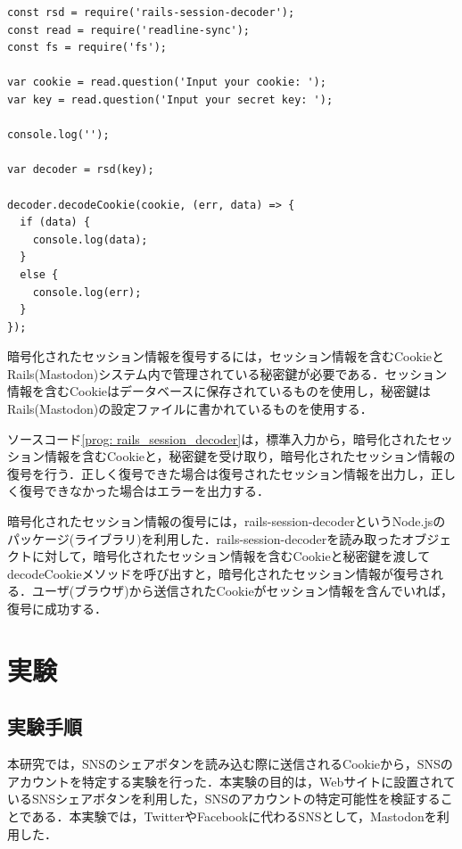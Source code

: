 \documentclass[10pt, a4paper]{jreport}
\begin{document}
\begin{lstlisting}[caption=Railsセッションデコーダ,label=prog: rails_session_decoder]
const rsd = require('rails-session-decoder');
const read = require('readline-sync');
const fs = require('fs');

var cookie = read.question('Input your cookie: ');
var key = read.question('Input your secret key: ');

console.log('');

var decoder = rsd(key);

decoder.decodeCookie(cookie, (err, data) => {
  if (data) {
    console.log(data);
  }
  else {
    console.log(err);
  }
});
\end{lstlisting}

暗号化されたセッション情報を復号するには，セッション情報を含むCookieとRails(Mastodon)システム内で管理されている秘密鍵が必要である．セッション情報を含むCookieはデータベースに保存されているものを使用し，秘密鍵はRails(Mastodon)の設定ファイルに書かれているものを使用する．

ソースコード\ref{prog: rails_session_decoder}は，標準入力から，暗号化されたセッション情報を含むCookieと，秘密鍵を受け取り，暗号化されたセッション情報の復号を行う．正しく復号できた場合は復号されたセッション情報を出力し，正しく復号できなかった場合はエラーを出力する．

暗号化されたセッション情報の復号には，rails-session-decoderというNode.jsのパッケージ(ライブラリ)を利用した\cite{npm_rails_session_decoder}．rails-session-decoderを読み取ったオブジェクトに対して，暗号化されたセッション情報を含むCookieと秘密鍵を渡してdecodeCookieメソッドを呼び出すと，暗号化されたセッション情報が復号される．ユーザ(ブラウザ)から送信されたCookieがセッション情報を含んでいれば，復号に成功する．






\chapter{実験}
\section{実験手順}
本研究では，SNSのシェアボタンを読み込む際に送信されるCookieから，SNSのアカウントを特定する実験を行った．本実験の目的は，Webサイトに設置されているSNSシェアボタンを利用した，SNSのアカウントの特定可能性を検証することである．本実験では，TwitterやFacebookに代わるSNSとして，Mastodonを利用した．
\end{document}
